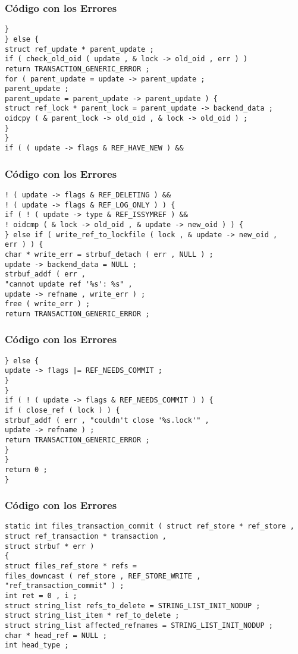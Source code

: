\documentclass{beamer}
\begin{document}
\begin{frame}[fragile]
\frametitle{C\'odigo con los Errores}
\begin{verbatim}
} 
} else { 
struct ref_update * parent_update ; 
if ( check_old_oid ( update , & lock -> old_oid , err ) ) 
return TRANSACTION_GENERIC_ERROR ; 
for ( parent_update = update -> parent_update ; 
parent_update ; 
parent_update = parent_update -> parent_update ) { 
struct ref_lock * parent_lock = parent_update -> backend_data ; 
oidcpy ( & parent_lock -> old_oid , & lock -> old_oid ) ; 
} 
} 
if ( ( update -> flags & REF_HAVE_NEW ) && 
\end{verbatim}
\end{frame}
\begin{frame}[fragile]
\frametitle{C\'odigo con los Errores}
\begin{verbatim}
! ( update -> flags & REF_DELETING ) && 
! ( update -> flags & REF_LOG_ONLY ) ) { 
if ( ! ( update -> type & REF_ISSYMREF ) && 
! oidcmp ( & lock -> old_oid , & update -> new_oid ) ) { 
} else if ( write_ref_to_lockfile ( lock , & update -> new_oid , 
err ) ) { 
char * write_err = strbuf_detach ( err , NULL ) ; 
update -> backend_data = NULL ; 
strbuf_addf ( err , 
"cannot update ref '%s': %s" , 
update -> refname , write_err ) ; 
free ( write_err ) ; 
return TRANSACTION_GENERIC_ERROR ; 
\end{verbatim}
\end{frame}
\begin{frame}[fragile]
\frametitle{C\'odigo con los Errores}
\begin{verbatim}
} else { 
update -> flags |= REF_NEEDS_COMMIT ; 
} 
} 
if ( ! ( update -> flags & REF_NEEDS_COMMIT ) ) { 
if ( close_ref ( lock ) ) { 
strbuf_addf ( err , "couldn't close '%s.lock'" , 
update -> refname ) ; 
return TRANSACTION_GENERIC_ERROR ; 
} 
} 
return 0 ; 
} 
\end{verbatim}
\end{frame}
\begin{frame}[fragile]
\frametitle{C\'odigo con los Errores}
\begin{verbatim}
static int files_transaction_commit ( struct ref_store * ref_store , 
struct ref_transaction * transaction , 
struct strbuf * err ) 
{ 
struct files_ref_store * refs = 
files_downcast ( ref_store , REF_STORE_WRITE , 
"ref_transaction_commit" ) ; 
int ret = 0 , i ; 
struct string_list refs_to_delete = STRING_LIST_INIT_NODUP ; 
struct string_list_item * ref_to_delete ; 
struct string_list affected_refnames = STRING_LIST_INIT_NODUP ; 
char * head_ref = NULL ; 
int head_type ; 
\end{verbatim}
\end{frame}
\end{document}
